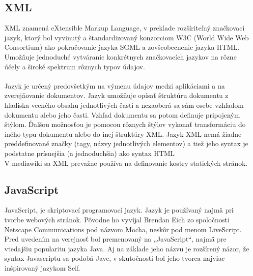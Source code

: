 \subsection{XML}
XML znamená eXtensible Markup Language, v preklade rozšíriteľný značkovací jazyk, ktorý bol vyvinutý a štandardizovaný konzorciom W3C (World Wide Web Consortium) ako pokračovanie jazyka SGML a zovšeobecnenie jazyka HTML. Umožňuje jednoduché vytváranie konkrétnych značkovacích jazykov na rôzne účely a široké spektrum rôznych typov údajov.\\
\\
Jazyk je určený predovšetkým na výmenu údajov medzi aplikáciami a na zverejňovanie dokumentov. Jazyk umožňuje opísať štruktúru dokumentu z hľadiska vecného obsahu jednotlivých častí a nezaoberá sa sám osebe vzhľadom dokumentu alebo jeho časti. Vzhľad dokumentu sa potom definuje pripojeným štýlom. Ďalšou možnosťou je pomocou rôznych štýlov vykonať transformáciu do iného typu dokumentu alebo do inej štruktúry XML.
Jazyk XML nemá žiadne preddefinované značky (tagy, názvy jednotlivých elementov) a tiež jeho syntax je podstatne prísnejšia (a jednoduchšia) ako syntax HTML
\\
V mediawiki sa XML prevažne používa na definovanie kostry statických stránok.
\subsection{JavaScript}
JavaScript, je skriptovací programovací jazyk. Jazyk je používaný najmä pri tvorbe webových stránok. Pôvodne ho vyvíjal Brendan Eich zo spoločnosti Netscape Communications pod názvom Mocha, neskôr pod menom LiveScript. Pred uvedením na verejnosť bol premenovaný na „JavaScript“, najmä pre vtedajšiu popularitu jazyka Java. Aj na základe jeho názvu je rozšírený názor, že syntax Javascriptu sa podobá Jave, v skutočnosti bol jeho tvorca najviac inšpirovaný jazykom Self.

